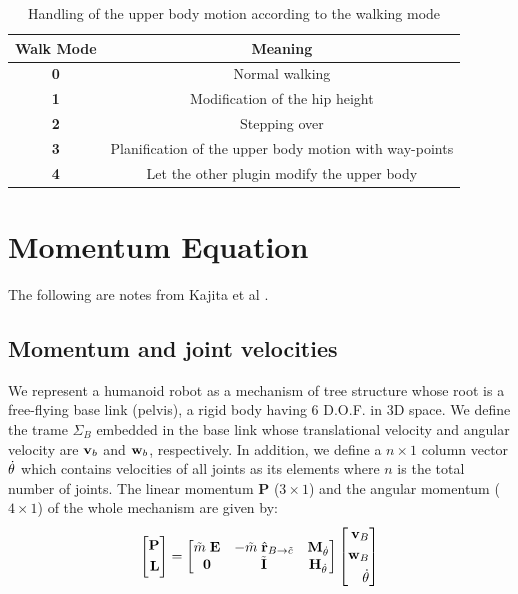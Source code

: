 \begin{table}
\begin{tabular}{|c|c|} \hline
Walk Mode & Meaning \\ \hline \hline
{\bf 0} & Normal walking \\
{\bf 1} & Modification of the hip height \\
{\bf 2} & Stepping over \\
{\bf 3} & Planification of the upper body motion with way-points \\
{\bf 4} & Let the other plugin modify the upper body \\ \hline
\end{tabular}
\caption{Handling of the upper body motion according to the walking mode}
\end{table}

\section{Momentum Equation}

The following are notes from Kajita et al \cite{Kajita2003b}.
\subsection{Momentum and joint velocities}
We represent a humanoid robot as a mechanism of tree structure whose root
is a free-flying base link (pelvis), a rigid body having 6 D.O.F. in
3D space. We define the trame $\Sigma_B$ embedded in the base link whose translational
velocity and angular velocity are $\textit{\bf v}_b$ and $\textit{\bf w}_b$,
respectively. In addition, we define a $n \times 1$ column vector $\dot{\bf \theta}$
which contains velocities of all joints as its elements where $n$ is the total
number of joints. The linear momentum $\textbf{P}$ ($3 \times 1$) and the
angular momentum ($4 \times 1$) of the whole mechanism are given by:
\begin{equation}
\left[
\begin{aligned}
\textbf{P}\\
\textbf{L}\\
\end{aligned}
\right] =
\left[
\begin{matrix}
\tilde{m}\; {\bf E} & -\tilde{m}\;\hat{\bf r}_{B \rightarrow \tilde{c}} & {\bf M} _{\dot{\theta}} \\
{\bf 0}            & \tilde{\bf I}                                &{\bf H}_{\dot{\theta}} \\
\end{matrix}
\right]
\left[
\begin{aligned}
\textit{\bf v}_B \\
\textit{\bf w}_B \\
\dot{\bf \theta} \\
\end{aligned}
\right]
\label{eq:GlobalMomentum}
\end{equation}

